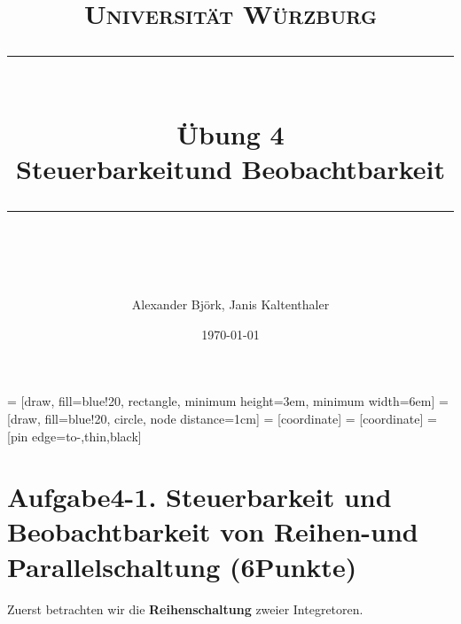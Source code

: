 \documentclass[11pt]{scrartcl} %
\title{	
	\normalfont\normalsize
	\textsc{Universität Würzburg}\\ %
	\vspace{25pt} %
	\rule{\linewidth}{0.5pt}\\ %
	\vspace{20pt} %
	{\huge Übung 4}\\ %
	{\Large Steuerbarkeitund Beobachtbarkeit}\\
	\vspace{12pt} %
	\rule{\linewidth}{2pt}\\ %
	\vspace{12pt} %
}
\author{\LARGE Alexander Björk, Janis Kaltenthaler} %
\date{\normalsize\today} %
\begin{document}
\maketitle %

 = [draw, fill=blue!20, rectangle, 
    minimum height=3em, minimum width=6em]
 = [draw, fill=blue!20, circle, node distance=1cm]
 = [coordinate]
 = [coordinate]
 = [pin edge={to-,thin,black}]
\newcommand{\inte}{$\displaystyle \int$}

\section*{Aufgabe4-1. Steuerbarkeit und Beobachtbarkeit von Reihen-und Parallelschaltung (6Punkte)}
Zuerst betrachten wir die \textbf{Reihenschaltung} zweier Integretoren.
\end{document}
